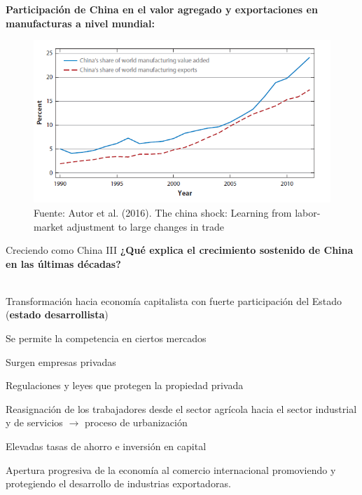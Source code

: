 \documentclass{beamer}
\let\tempone\itemize
\let\temptwo\enditemize
\renewenvironment{itemize}{\tempone\addtolength{\itemsep}{0.5\baselineskip}}{\temptwo}
\begin{document}
	\begin{frame}[plain]
		\textbf{Participación de China en el valor agregado y exportaciones en manufacturas a nivel mundial:}
		\medskip
		\begin{figure}
			\centering
			\includegraphics[width=.7\linewidth, keepaspectratio]{manufacturing} \\
			{\footnotesize{Fuente: Autor et al. (2016). The china shock: Learning from labor-market adjustment to large changes in trade}}
		\end{figure}
	\end{frame}

	\begin{frame}{Creciendo como China III}
			\textbf{¿Qué explica el crecimiento sostenido de China en las últimas décadas?}\\~\\
			\pause
			\begin{itemize}
				\item Transformación hacia economía capitalista con fuerte participación del Estado (\textbf{estado desarrollista})
				\begin{itemize}
					\item Se permite la competencia en ciertos mercados
					\item Surgen empresas privadas
					\item Regulaciones y leyes que protegen la propiedad privada
				\end{itemize}
				\item Reasignación de los trabajadores desde el sector agrícola hacia el sector industrial y de servicios $\rightarrow$ proceso de urbanización
				\item Elevadas tasas de ahorro e inversión en capital
				\item Apertura progresiva de la economía al comercio internacional promoviendo y protegiendo el desarrollo de industrias exportadoras.
			\end{itemize}
	\end{frame}
\end{document}
